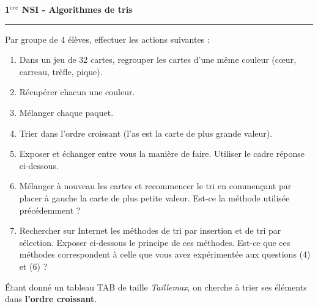 \documentclass[a4paper,french]{article}
\newcounter{exonum}
\newcommand{\Exo}{\addtocounter{exonum}{1}{{\large \textbf {Exercice \theexonum .}}}}
\newcommand{\Titre}[1]{\textbf{{\large{#1}}}}
\begin{document}
\pagestyle{empty}
\parindent 0mm

\begin{center}
\Titre{1$^{\grave{e}re}$ NSI  -  Algorithmes de tris}
\\[5mm]
\end{center}
\hrule
\vspace*{5mm}

\Exo

Par groupe de 4 élèves, effectuer les actions suivantes :
\begin{enumerate}
\item Dans un jeu de 32 cartes, regrouper les cartes d'une même couleur (cœur, carreau, trèfle, pique).
\item Récupérer chacun une couleur.

\item Mélanger chaque paquet.

\item Trier dans l'ordre croissant (l'as est la carte de plus grande valeur).

\item Exposer et échanger entre vous la manière de faire. Utiliser le cadre réponse ci-dessous.

\noindent{}

\item Mélanger à nouveau les cartes et recommencer le tri en commençant par placer à gauche la carte de plus petite valeur. Est-ce la méthode utilisée précédemment ?

\noindent{}

\item Rechercher sur Internet les méthodes de tri par insertion et de tri par sélection. Exposer ci-dessous le principe de ces méthodes. Est-ce que ces méthodes correspondent à celle que vous avez expérimentée aux questions (4) et (6) ?

\noindent{}
\end{enumerate}
\pagebreak

\Exo
\pagebreak


Étant donné un tableau TAB de taille \textit{Taillemax}, on cherche à trier ses éléments dans \textbf{l'ordre croissant}.
\end{document}
